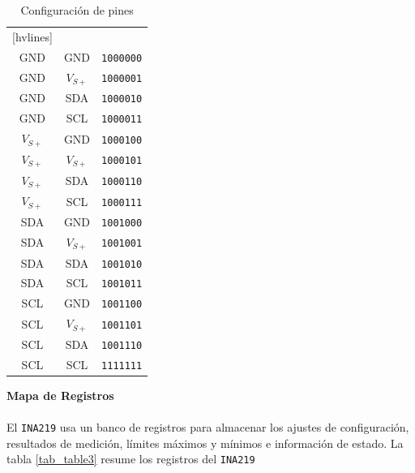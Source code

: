 \documentclass[12pt,a4paper]{article}
\begin{document}
 	\begin{table}[H]
 		\centering
 	 \begin{NiceTabular}{ccc}[hvlines]
 	 	 &  &  \\
 	 	GND & GND & \texttt{1000000}\\
 	 	GND & $V_{S+}$ & \texttt{1000001}\\
 	 	GND & SDA &  \texttt{1000010}\\
 	 	GND & SCL & \texttt{1000011}\\
 	 	$V_{S+}$ & GND & \texttt{1000100}\\
 	 	$V_{S+}$ & $V_{S+}$ & \texttt{1000101}\\
 	 	$V_{S+}$ & SDA & \texttt{1000110}\\
 	 	$V_{S+}$ & SCL & \texttt{1000111}\\
 	 	SDA & GND & \texttt{1001000}\\
 	 	SDA & $V_{S+}$ & \texttt{1001001}\\
 	 	SDA & SDA & \texttt{1001010}\\
 	 	SDA & SCL & \texttt{1001011}\\
 	 	SCL & GND & \texttt{1001100}\\
 	 	SCL & $V_{S+}$ & \texttt{1001101}\\
 	 	SCL & SDA & \texttt{1001110}\\
 	 	SCL & SCL & \texttt{1111111}\\
 	 \end{NiceTabular}
  \caption{Configuración de pines}
  \label{tab:table2}
  	\end{table}
  
  \newpage
  \noindent \textbf{Mapa de Registros}\\\\
  El \texttt{INA219} usa un banco de registros para almacenar los ajustes de configuración, resultados de medición, límites máximos y mínimos e información de estado. La tabla \ref{tab_table3} resume los registros del \texttt{INA219}
  
\end{document}
